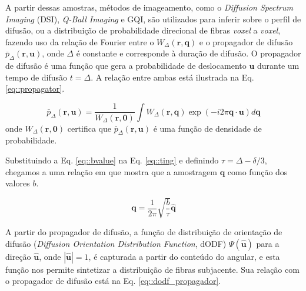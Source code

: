\documentclass[
    12pt,                %
    oneside,            %
    a4paper,            %
    english,            %
    french,                %
    spanish,            %
    brazil                %
    ]{abntex2}
\begin{document}
A partir dessas amostras, métodos de imageamento, como o \textit{Diffusion Spectrum Imaging} (DSI), \textit{Q-Ball Imaging} e GQI, são utilizados para inferir sobre o perfil de difusão, ou  a distribuição de probabilidade direcional de fibras \textit{voxel} a \textit{voxel}, fazendo uso da relação de Fourier entre o $W_{\Delta}(\mathbf{r}, \mathbf{q})$ e o propagador de difusão $\bar{p}_{\Delta}(\mathbf{r}, \mathbf{u})$, onde $\Delta$ é constante e corresponde à duração de difusão. O propagador de difusão é uma função que gera a probabilidade de deslocamento $\mathbf{u}$ durante um tempo de difusão $t = \Delta$. A relação entre ambas está ilustrada na Eq. \ref{eq::propagator}.


\begin{equation}
\label{eq::propagator}
    \bar{p}_{\Delta}(\mathbf{r}, \mathbf{u}) =\frac{1}{W_{\Delta}(\mathbf{r},\mathbf{0}) } \int W_{\Delta}(\mathbf{r},\mathbf{q}) \exp (-i2 \pi \mathbf{q} \cdot \mathbf{u}) d \mathbf{q}
\end{equation}
onde $W_{\Delta}(\mathbf{r},\mathbf{0})$ certifica que $\bar{p}_{\Delta}(\mathbf{r}, \mathbf{u})$ é uma função de densidade de probabilidade.


Substituindo a Eq. \ref{eq::bvalue} na Eq. \ref{eq::ting} e definindo $\tau = \Delta - \delta/3$, chegamos a uma relação em que mostra que a amostragem $\mathbf{q}$ como função dos valores $b$.

\begin{equation}
\label{eq::qspace_bvalue}
\mathbf{q} = \frac{1}{2\pi}\sqrt{\frac{b}{\tau}} \mathbf{\hat{q}}
\end{equation}

A partir do propagador de difusão, a função de distribuição de orientação de difusão (\textit{Diffusion Orientation Distribution Function}, dODF) $\Psi(\mathbf{\hat{u}})$ para a direção $\mathbf{\hat{u}}$, onde $|\mathbf{\hat{u}}| = 1$, é capturada a partir do conteúdo do angular, e esta função nos permite sintetizar a distribuição de fibras subjacente. Sua relação com o propagador de difusão está na Eq. \ref{eq::dodf_propagador}.
\end{document}
